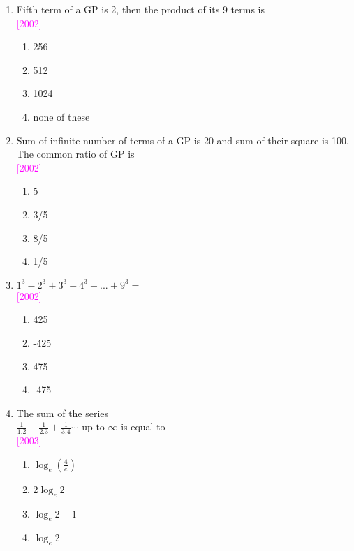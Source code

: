 \documentclass[journal,12pt,twocolumn]{IEEEtran}
\theoremstyle{remark}
\begin{document}
\begin{enumerate}[label=\textcolor{magenta}{\arabic*.}]
\item {Fifth term of a GP is 2, then the product of its 9 terms is}\\ \textcolor {magenta}{\hfill{[2002]}} \\
\begin{enumerate}[label={(\alph*)}]
\item  {256}
\item  {512}
\item  {1024}
\item  {none of these}
\end{enumerate}

\item {Sum of infinite number of terms of a GP is 20 and sum of their square is 100. The common ratio of GP is}\\ \textcolor {magenta}{\hfill{[2002]}} \\
\begin{enumerate}[label={(\alph*)}]
\item  {5}
\item  {3/5}
\item  {8/5}
\item  {1/5}
\end{enumerate} 

\item {$1^{3}-2^{3}+3^{3}-4^{3}+...
+9^{3}=$}\\ \textcolor {magenta}{\hfill{[2002]}} \\
\begin{enumerate}[label={(\alph*)}]
\item  {425}
\item  {-425}
\item  {475}
\item  {-475}
\end{enumerate}

\item {The sum of the series \\ $\frac{1}{1.2}-\frac{1}{2.3}+\frac{1}{3.4}\cdots \text{ up to } \infty$ is equal to}\\ \textcolor {magenta}{\hfill{[2003]}} \\
\begin{enumerate}[label={(\alph*)}]
\item  {$\log_e (\frac{4}{e})$}
\item  {2$\log_e 2$}
\item  {$\log_e 2-1$}
\item  {$\log_e 2$}
\end{enumerate}


\end{enumerate}
\end{document}
